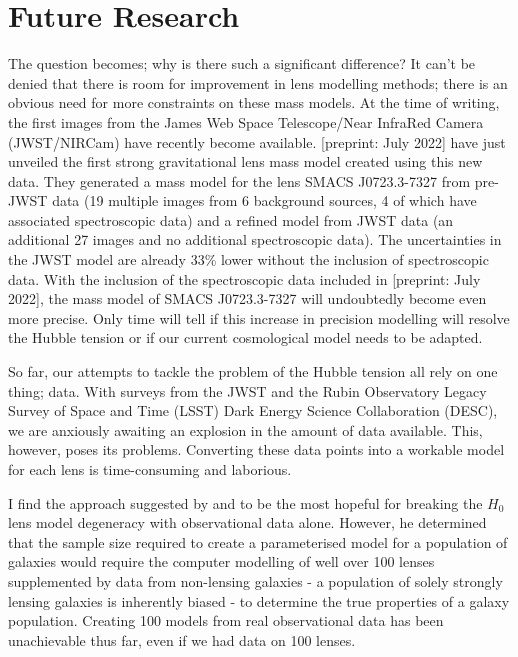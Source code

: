 \documentclass[12pt]{report}
\begin{document}
\section{Future Research}

The question becomes; why is there such a significant difference? It can't be denied that there is room for improvement in lens modelling methods; there is an obvious need for more constraints on these mass models. At the time of writing, the first images from the James Web Space Telescope/Near InfraRed Camera (JWST/NIRCam) have recently become available. \textcite{Caminha2022} [preprint: July 2022] have just unveiled the first strong gravitational lens mass model created using this new data. They generated a mass model for the lens SMACS J0723.3-7327 from pre-JWST data (19 multiple images from 6 background sources, 4 of which have associated spectroscopic data) and a refined model from JWST data (an additional 27 images and no additional spectroscopic data). The uncertainties in the JWST model are already 33\% lower without the inclusion of spectroscopic data. With the inclusion of the spectroscopic data included in \textcite{Mahler2022} [preprint: July 2022], the mass model of SMACS J0723.3-7327 will undoubtedly become even more precise. Only time will tell if this increase in precision modelling will resolve the Hubble tension or if our current cosmological model needs to be adapted. 

So far, our attempts to tackle the problem of the Hubble tension all rely on one thing; data. With surveys from the JWST and the Rubin Observatory Legacy Survey of Space and Time (LSST) Dark Energy Science Collaboration (DESC), we are anxiously awaiting an explosion in the amount of data available. This, however, poses its problems. Converting these data points into a workable model for each lens is time-consuming and laborious.

I find the approach suggested by \textcite{Sonnenfeld2021} and \textcite{Sonnenfeld2022} to be the most hopeful for breaking the $H_{0}$ lens model degeneracy with observational data alone. However, he determined that the sample size required to create a parameterised model for a population of galaxies would require the computer modelling of well over 100 lenses supplemented by data from non-lensing galaxies - a population of solely strongly lensing galaxies is inherently biased - to determine the true properties of a galaxy population. Creating 100 models from real observational data has been unachievable thus far, even if we had data on 100 lenses.
\end{document}
